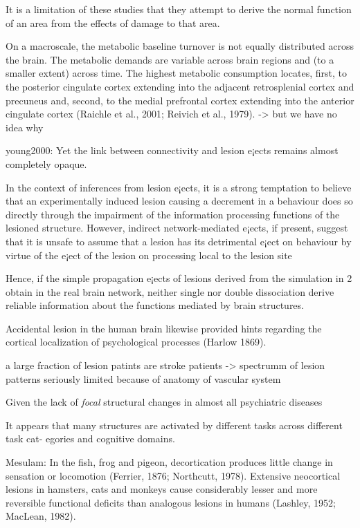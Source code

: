 \documentclass[authoryear,review,3p]{elsarticle}
\begin{document}
It is a limitation of these studies that they attempt to derive the normal function of an area from the effects of damage to that area.

On a macroscale, the metabolic baseline turnover is not equally distributed across the brain. The metabolic demands are variable across brain regions and (to a smaller extent) across time. The highest metabolic consumption locates, first, to the posterior cingulate cortex extending into the adjacent retrosplenial cortex and precuneus and, second, to the medial prefrontal cortex extending into the anterior cingulate cortex (Raichle et al., 2001; Reivich et al., 1979).
-> but we have no idea why

young2000:
Yet the link between connectivity and lesion e¡ects remains almost completely opaque.

In the context of inferences from lesion e¡ects, it is a strong temptation to believe that an experimentally induced lesion causing a decrement in a behaviour does so directly through the impairment of the information processing functions of the lesioned structure. However, indirect network-mediated e¡ects, if present, suggest that it is unsafe to assume that a lesion has its detrimental e¡ect on behaviour by virtue of the e¡ect of the lesion on processing local to the lesion site

Hence, if the simple propagation e¡ects of lesions derived from the simulation in 2 obtain in the real brain network, neither single nor double dissociation derive reliable information about the functions mediated by brain structures.

Accidental lesion in the human brain likewise provided hints regarding the cortical localization of psychological processes (Harlow 1869). 

a large fraction of lesion patints are stroke patients
-> spectrumm of lesion patterns seriously limited because of
anatomy of vascular system

Given the lack of \textit{focal} structural changes in almost all psychiatric diseases

It appears that many structures are activated by different tasks across different task cat- egories and cognitive domains. 

Mesulam:
In the fish, frog and pigeon, decortication produces little change in sensation or locomotion (Ferrier, 1876; Northcutt, 1978). Extensive neocortical lesions in hamsters, cats and monkeys cause considerably lesser and more reversible functional deficits than analogous lesions in humans (Lashley, 1952; MacLean, 1982).
\end{document}
